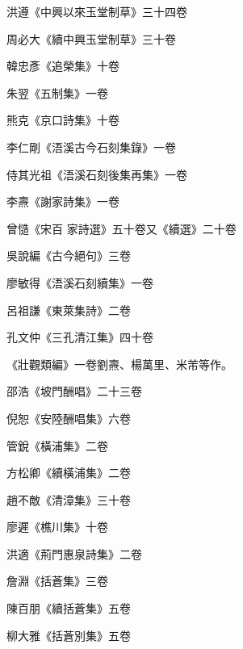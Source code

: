 \begin{pinyinscope}
 洪遵《中興以來玉堂制草》三十四卷



 周必大《續中興玉堂制草》三十卷



 韓忠彥《追榮集》十卷



 朱翌《五制集》一卷



 熊克《京口詩集》十卷



 李仁剛《浯溪古今石刻集錄》一卷



 侍其光祖《浯溪石刻後集再集》一卷



 李燾《謝家詩集》一卷



 曾慥《宋百
 家詩選》五十卷又《續選》二十卷



 吳說編《古今絕句》三卷



 廖敏得《浯溪石刻續集》一卷



 呂祖謙《東萊集詩》二卷



 孔文仲《三孔清江集》四十卷



 《壯觀類編》一卷劉燾、楊萬里、米芾等作。



 邵浩《坡門酬唱》二十三卷



 倪恕《安陸酬唱集》六卷



 管銳《橫浦集》二卷



 方松卿《續橫浦集》二卷



 趙不敵《清漳集》三十卷



 廖遲《樵川集》十卷



 洪適《荊門惠泉詩集》二卷



 詹淵《括蒼集》三卷



 陳百朋《續括蒼集》五卷



 柳大雅《括蒼別集》五卷




\end{pinyinscope}
